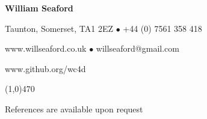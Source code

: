 \documentclass[11pt]{article}
\begin{document}
\centerline{\LARGE \bf William Seaford}					
\centerline{Taunton, Somerset, TA1 2EZ $\bullet$ +44 (0) 7561 358 418}
\centerline{www.willseaford.co.uk $\bullet$ willseaford@gmail.com}
\centerline{www.github.org/wc4d}
\noindent 												
\line(1,0){470}
\newline



\pagebreak


\centerline{References are available upon request}
\end{document}
